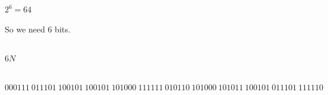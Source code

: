 \documentclass[UTF8]{ctexart}
\begin{document}
\section{}
\subsection{}
$2^6=64$

So we need 6 bits.
\subsection{}
$6N$
\subsection{}
$000111\ 011101\ 100101\ 100101\ 101000\ 111111\ 010110\ 101000\ 101011\ 100101\ 011101\ 111110$



\end{document}
